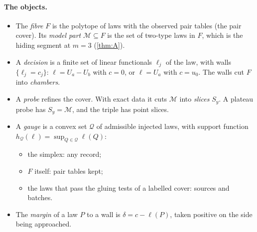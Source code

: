 \documentclass[11pt]{article}
\theoremstyle{definition}\newtheorem{definition}{Definition}\newtheorem{remark}{Remark}
\begin{document}
\paragraph{The objects.}
\begin{itemize}
\item The \emph{fibre} $F$ is the polytope of laws with the observed pair tables (the pair cover). Its \emph{model part}
  $\mathcal M\subseteq F$ is the set of two-type laws in $F$, which is the hiding segment at $m=3$ (\cref{thm:A}).
\item A \emph{decision} is a finite set of linear functionals $\ell_j$ of the law, with walls $\{\ell_j=c_j\}$: $\ell=U_a-U_b$
  with $c=0$, or $\ell=U_a$ with $c=u_0$. The walls cut $F$ into \emph{chambers}.
\item A \emph{probe} refines the cover. With exact data it cuts $\mathcal M$ into \emph{slices} $S_y$. A plateau probe has $S_y=\mathcal M$,
  and the triple has point slices.
\item A \emph{gauge} is a convex set $\mathcal Q$ of admissible injected laws, with support function $h_{\mathcal Q}(\ell)=\sup_{Q\in\mathcal Q}\ell(Q)$:
  \begin{itemize}
  \item the simplex: any record;
  \item $F$ itself: pair tables kept;
  \item the laws that pass the gluing tests of a labelled cover: sources and batches.
  \end{itemize}
\item The \emph{margin} of a law $P$ to a wall is $\delta=c-\ell(P)$, taken positive on the side being approached.
\end{itemize}
\end{document}
